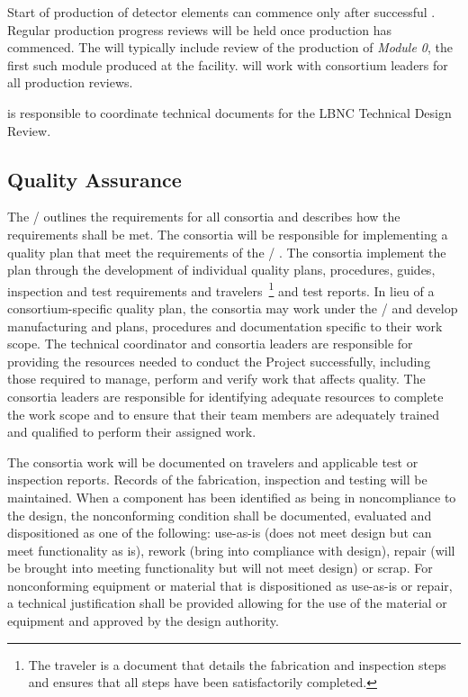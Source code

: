 Start of production of detector elements can commence only after
successful . Regular production progress
reviews will be held once production has commenced. The 
will typically include review of the production of \textit{Module 0}, the
first such module produced at the facility.  will work with
consortium leaders for all production reviews.

 is responsible to coordinate technical documents for the LBNC
Technical Design Review.

\subsection{Quality Assurance}
\label{sec:fdsp-coord-qa}


The /  outlines the  requirements
for all  consortia and describes how the requirements
shall be met. The consortia will be responsible for implementing a
quality plan that meet the requirements of the
/ .  The consortia implement the
plan through the development of individual quality plans, procedures,
guides,  inspection and test requirements and travelers~\footnote{The
  traveler is a document that details the fabrication and inspection
  steps and ensures that all steps have been satisfactorily
  completed.} and test reports.  In lieu of a consortium-specific quality
plan, 
the consortia may work under the /
 and develop manufacturing and  plans, procedures and
documentation specific to their work scope.  The technical coordinator 
and consortia leaders are responsible for
providing the resources needed to conduct the Project successfully,
including those required to manage, perform and verify work that
affects quality.  The  consortia leaders are responsible
for identifying adequate resources to complete the work scope and to
ensure that their team members are adequately trained and qualified to
perform their assigned work.

The consortia work will be documented on travelers and applicable test
or inspection reports. Records of the fabrication, inspection and
testing will be maintained. When a component has been identified as
being in noncompliance to the design, the nonconforming condition
shall be documented, evaluated and dispositioned as one of the following: use-as-is (does
not meet design but can meet functionality as is), rework (bring into
compliance with design), repair (will be brought into meeting
functionality but will not meet design) or scrap. For nonconforming
equipment or material that is dispositioned as use-as-is or repair, a
technical justification shall be provided allowing for the use of the
material or equipment and approved by the design authority.

